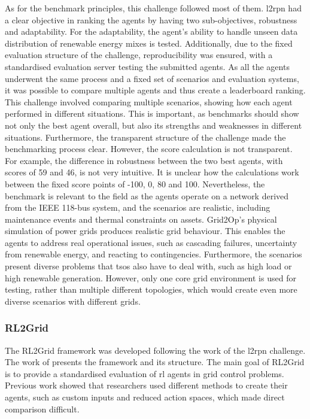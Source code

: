 As for the benchmark principles, this challenge followed most of them. \ac{l2rpn} had a clear objective in ranking the agents by having two sub-objectives, robustness and adaptability. For the adaptability, the agent's ability to handle unseen data distribution of renewable energy mixes is tested. Additionally, due to the fixed evaluation structure of the challenge, reproducibility was ensured, with a standardised evaluation server testing the submitted agents. As all the agents underwent the same process and a fixed set of scenarios and evaluation systems, it was possible to compare multiple agents and thus create a leaderboard ranking. This challenge involved comparing multiple scenarios, showing how each agent performed in different situations. This is important, as benchmarks should show not only the best agent overall, but also its strengths and weaknesses in different situations. Furthermore, the transparent structure of the challenge made the benchmarking process clear. However, the score calculation is not transparent. For example, the difference in robustness between the two best agents, with scores of 59 and 46, is not very intuitive. It is unclear how the calculations work between the fixed score points of -100, 0, 80 and 100. Nevertheless, the benchmark is relevant to the field as the agents operate on a network derived from the IEEE 118-bus system, and the scenarios are realistic, including maintenance events and thermal constraints on assets. Grid2Op's physical simulation of power grids produces realistic grid behaviour. This enables the agents to address real operational issues, such as cascading failures, uncertainty from renewable energy, and reacting to contingencies. Furthermore, the scenarios present diverse problems that \acp{tso} also have to deal with, such as high load or high renewable generation. However, only one core grid environment is used for testing, rather than multiple different topologies, which would create even more diverse scenarios with different grids.


\subsubsection{RL2Grid}
The RL2Grid framework was developed following the work of the \ac{l2rpn} challenge. The work of \citet{rl2grid} presents the framework and its structure. The main goal of RL2Grid is to provide a standardised evaluation of \ac{rl} agents in grid control problems. Previous work showed that researchers used different methods to create their agents, such as custom inputs and reduced action spaces, which made direct comparison difficult. 


